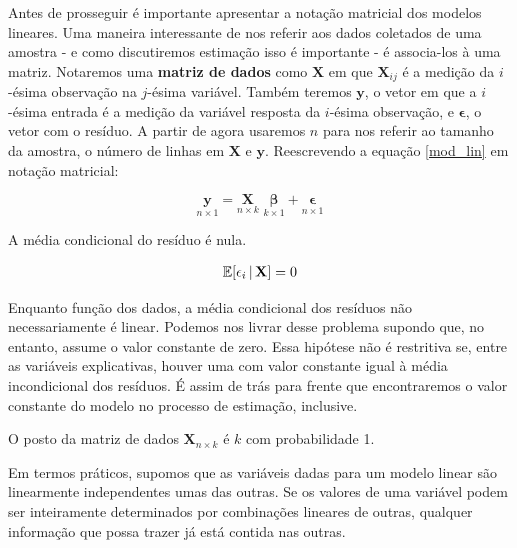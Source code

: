 Antes de prosseguir é importante apresentar a notação matricial dos modelos lineares. Uma maneira interessante de nos referir aos dados coletados de uma amostra - e como discutiremos estimação isso é importante - é associa-los à uma matriz. Notaremos uma \textbf{matriz de dados} como $\mathbf{X}$ em que $\mathbf{X}_{ij}$ é a medição da $i$-ésima observação na $j$-ésima variável. Também teremos $\mathbf{y}$, o vetor em que a $i$-ésima entrada é a medição da variável resposta da $i$-ésima observação, e $\mathbf{\epsilon}$, o vetor com o resíduo. A partir de agora usaremos $n$ para nos referir ao tamanho da amostra, o número de linhas em $\mathbf{X}$ e $\mathbf{y}$. Reescrevendo a equação \ref{mod_lin} em notação matricial:

\begin{equation}
    \underset{n \times 1}{\mathbf{y}} = \underset{n \times k}{\mathbf{X}} \,\, \underset{k \times 1}{\boldsymbol{\beta}}   + \underset{n \times 1}{\boldsymbol{\epsilon}}
\end{equation}



\begin{hipotese}
A média condicional do resíduo é nula.

\begin{align}
    \mathbb{E}[\epsilon_i \, | \, \mathbf{X}] = 0
\end{align}

Enquanto função dos dados, a média condicional dos resíduos não necessariamente é linear. Podemos nos livrar desse problema supondo que, no entanto, assume o valor constante de zero. Essa hipótese não é restritiva se, entre as variáveis explicativas, houver uma com valor constante igual à média incondicional dos resíduos. É assim de trás para frente que encontraremos o valor constante do modelo no processo de estimação, inclusive. 

\end{hipotese}

\begin{hipotese}
O posto da matriz de dados $\mathbf{X}_{n \times k}$ é $k$ com probabilidade 1.
\end{hipotese}

Em termos práticos, supomos que as variáveis dadas para um modelo linear são linearmente independentes umas das outras. Se os valores de uma variável podem ser inteiramente determinados por combinações lineares de outras, qualquer informação que possa trazer já está contida nas outras.

